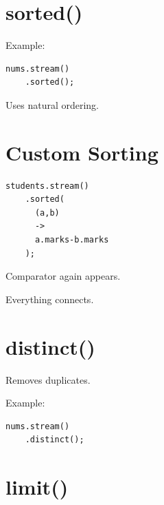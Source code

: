 \documentclass[11pt,a4paper]{book}
\begin{document}

\section{sorted()}

Example:

\begin{verbatim} 
nums.stream()
    .sorted();
\end{verbatim}


Uses natural ordering.


\section{Custom Sorting}

\begin{verbatim} 
students.stream()
    .sorted(
      (a,b)
      ->
      a.marks-b.marks
    );
\end{verbatim}


Comparator again appears.


Everything connects.


\section{distinct()}

Removes duplicates.


Example:

\begin{verbatim} 
nums.stream()
    .distinct();
\end{verbatim}


\section{limit()}
\end{document}
